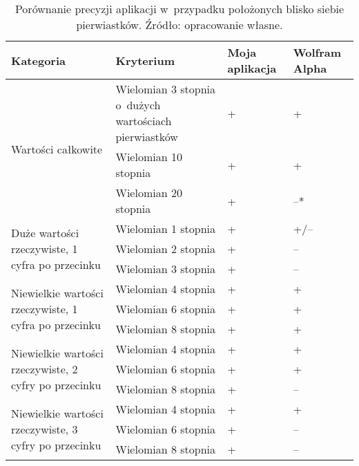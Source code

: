 \begin{table}[H]
	\begin{tabular}{ |p{5cm}|p{5cm}|p{1.5cm}|p{1.5cm}| } 
		\hline
		Kategoria & Kryterium & Moja aplikacja & Wolfram Alpha \\
		\hline
		\multirow{3}{*}{Wartości całkowite}
		& Wielomian 3 stopnia o~dużych wartościach pierwiastków & + & + \\
		& Wielomian 10 stopnia & + & + \\
		& Wielomian 20 stopnia & + & --* \\
		\hline
		\multirow{3}{12em}{Duże wartości rzeczywiste, 1 cyfra po przecinku}
		& Wielomian 1 stopnia & + & +/-- \\
		& Wielomian 2 stopnia & + & -- \\
		& Wielomian 3 stopnia & + & -- \\
		\hline
		\multirow{3}{14em}{Niewielkie wartości rzeczywiste, 1 cyfra po przecinku}
		& Wielomian 4 stopnia & + & + \\
		& Wielomian 6 stopnia & + & + \\
		& Wielomian 8 stopnia & + & + \\
		\hline
		\multirow{3}{14em}{Niewielkie wartości rzeczywiste, 2 cyfry po przecinku}
		& Wielomian 4 stopnia & + & + \\
		& Wielomian 6 stopnia & + & + \\
		& Wielomian 8 stopnia & + & -- \\
		\hline
		\multirow{3}{14em}{Niewielkie wartości rzeczywiste, 3 cyfry po przecinku}
		& Wielomian 4 stopnia & + & + \\
		& Wielomian 6 stopnia & + & -- \\
		& Wielomian 8 stopnia & + & -- \\
		\hline
	\end{tabular}
	\caption{Porównanie precyzji aplikacji w~przypadku położonych blisko siebie pierwiastków. Źródło: opracowanie własne.}
\end{table}